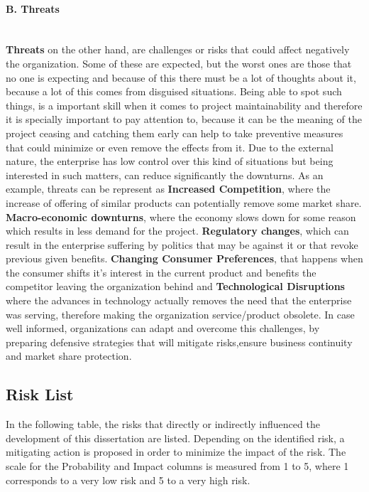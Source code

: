 \paragraph{B. Threats}\mbox{}\\
\textbf{Threats} on the other hand, are challenges or risks that could affect negatively the organization. Some of these are expected, but the worst ones are those that no one is expecting and because of this there must be a lot of thoughts about it, because a lot of this comes from disguised situations. Being able to spot such things, is a important skill when it comes to project maintainability and therefore it is specially important to pay attention to, because it can be the meaning of the project ceasing and catching them early can help to take preventive measures that could minimize or even remove the effects from it. Due to the external nature, the enterprise has low control over this kind of situations but being interested in such matters, can reduce significantly the downturns.
As an example, threats can be represent as \textbf{Increased Competition}, where the increase of offering of similar products can potentially remove some market share. \textbf{Macro-economic downturns}, where the economy slows down for some reason which results in less demand for the project. \textbf{Regulatory changes}, which can result in the enterprise suffering by politics that may be against it or that revoke previous given benefits. \textbf{Changing Consumer Preferences}, that happens when the consumer shifts it's interest in the current product and benefits the competitor leaving the organization behind and \textbf{Technological Disruptions} where the advances in technology actually removes the need that the enterprise was serving, therefore making the organization service/product obsolete.
In case well informed, organizations can adapt and overcome this challenges, by preparing defensive strategies that will mitigate risks,ensure business continuity and market share protection.

\subsection{Risk List}

In the following table, the risks that directly or indirectly influenced the development of this dissertation are listed. Depending on the identified risk, a mitigating action is proposed in order to minimize the impact of the risk. The scale for the Probability and Impact columns is measured from 1 to 5, where 1 corresponds to a very low risk and 5 to a very high risk.

